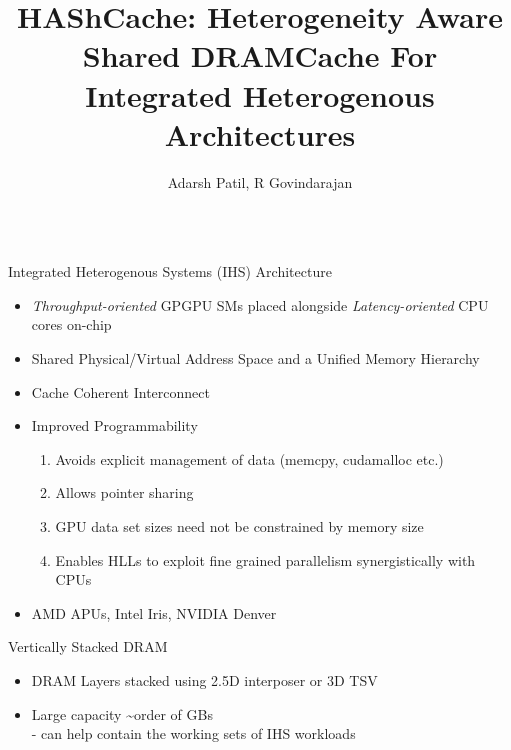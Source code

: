 \documentclass[final,t]{beamer}
\title{\LARGE HAShCache: Heterogeneity Aware Shared DRAMCache For Integrated Heterogenous Architectures}
\author{Adarsh Patil, R Govindarajan}
\institute{Department of CSA, Indian Institute of Science, Bangalore }
\begin{document}


\begin{frame}[t,fragile]{}
\begin{columns}[t]

\small

\begin{column}{.47\linewidth}

    \begin{exampleblock}{Integrated Heterogenous Systems (IHS) Architecture}
    \begin{itemize}
    	\item \textit{Throughput-oriented} GPGPU SMs placed alongside \textit{Latency-oriented} CPU cores on-chip
   		\item Shared Physical/Virtual Address Space and a Unified Memory Hierarchy 
		\item Cache Coherent Interconnect
    	\item Improved Programmability
    	\begin{enumerate}[i]
	    	\item Avoids explicit management of data (memcpy, cudamalloc etc.)
	    	\item Allows pointer sharing
	    	\item GPU data set sizes need not be constrained by memory size
	    	\item Enables HLLs to exploit fine grained parallelism synergistically with CPUs
    	\end{enumerate}
		\item AMD APUs, Intel Iris, NVIDIA Denver
    \end{itemize}
    \end{exampleblock}
    \begin{exampleblock}{Vertically Stacked DRAM}
    \begin{itemize}
        	\item DRAM Layers stacked using 2.5D interposer or 3D TSV
       		\item Large capacity \textasciitilde order of GBs \\
       				\qquad - can help contain the working sets of IHS workloads

\end{itemize}
\end{exampleblock}
\end{column}
\end{columns}
\end{frame}
\end{document}
